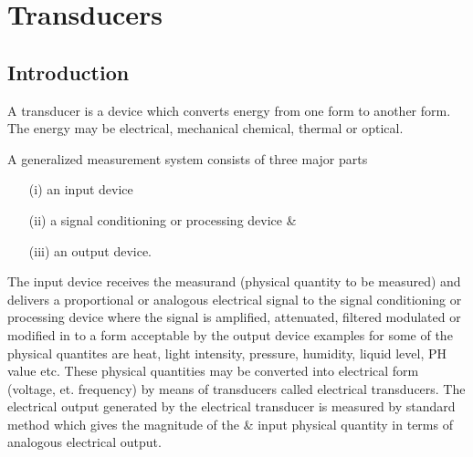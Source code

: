 \makeatletter
\def\@makechapterhead#1{%
  \vspace*{10\p@}%
  {\parindent \z@ \raggedleft \normalfont
    \ifnum \c@secnumdepth >\m@ne
      \if@mainmatter
        \LARGE\bfseries \@chapapp\space \thechapter
	\vskip 4pt
        \hrule height 2pt
        \par\nobreak
        \vskip 5\p@
      \fi
    \fi
    \interlinepenalty\@M
    \huge \bfseries #1\par\nobreak
\vskip 5pt

\hrule height 2pt   
 \vskip 10\p@  
  }}
\makeatother

\setcounter{chapter}{8}
\chapter{Transducers}\label{chap9}

\section{Introduction}\label{sec9.1}%
A transducer is a device which converts energy from one form to
another form. The energy may be electrical, mechanical chemical,
thermal or optical.

A generalized measurement system consists of three major parts 
\begin{itemize}
\item[(i)] an input device
\item[(ii)] a signal conditioning or processing device \&
\item[(iii)] an output device.
\end{itemize}

The input device receives the measurand (physical quantity to be
measured) and delivers a proportional or analogous electrical signal
to the signal conditioning or processing device where the signal is
amplified, attenuated, filtered  modulated  or modified in to a form
acceptable by the output device examples for some of the physical
quantites are heat, light intensity, pressure, humidity, liquid level,
PH value etc. These physical quantities may be converted into
electrical form (voltage, et. frequency) by means of transducers
called electrical transducers. The electrical output generated by the
electrical transducer is measured by standard method which gives the
magnitude of the \& input physical quantity in terms of analogous
electrical output.

